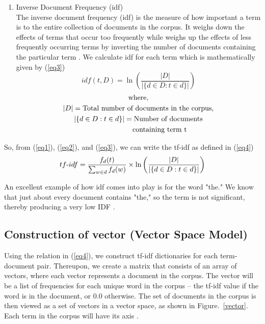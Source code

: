 \documentclass[conference]{IEEEtran}
\begin{document}
\begin{enumerate}
\twocolumn

\item Inverse Document Frequency (idf)\\
     The inverse document frequency (idf) is the measure of how important a term
     is to the entire collection of documents in the corpus. It weighs down the
     effects of terms that occur too frequently while weighs up the effects of
     less frequently occurring terms by inverting the number of documents
     containing the particular term \cite{r6}. We calculate idf for each term
     which is mathematically given by (\ref{eq3})
\begin{equation}idf(t,D) = \ln\left({\frac{|D|}{|\{d\in D : t \in d\}|}}\right) \label{eq3}
\end{equation}
   \begin{gather*}
  \text{where},\\
  |D|=\text{Total number of documents in the corpus},\\
  |\{d\in D : t \in d\}| = \text{Number of documents}\\ \text{\qquad \qquad \quad \quad containing term t}
\end{gather*}
 \end{enumerate}

So, from (\ref{eq1}), (\ref{eq2}), and (\ref{eq3}), we can write the tf-idf as defined in (\ref {eq4})
\begin{equation}
tf\textnormal{-}idf= \frac{f_d(t)}{\sum_{w\in d}{f_d(w)}} \times \ln\left({\frac{|D|}{|\{d\in D : t \in d\}|}}\right) \label {eq4}
\end{equation}

An excellent example of how idf comes into play is for the word "the." 
We know that just about every document contains "the," so the term 
is not significant, thereby producing a very low IDF \cite{r7}. 
    
\subsection {Construction of vector (Vector Space Model)}
Using the relation in (\ref{eq4}), we construct tf-idf dictionaries for each
term-document pair. Thereupon, we create a matrix that consists of an array of
vectors, where each vector represents a document in the corpus. The vector will
be a list of frequencies for each unique word in the corpus -- the tf-idf value
if the word is in the document, or 0.0 otherwise. The set of documents in the
corpus is then viewed as a set of vectors in a vector space, as shown in Figure.~\ref{vector}.
Each term in the corpus will have its axis \cite{r8}.
\end{document}

